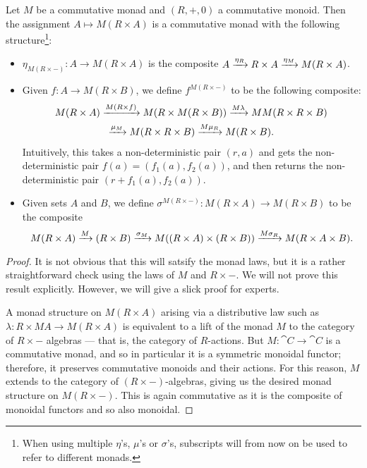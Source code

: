 \documentclass[DynamicalBook]{subfiles}
\begin{document}
\begin{proposition}
Let $M$ be a commutative monad and $(R, +, 0)$ a commutative monoid. Then the
assignment $A \mapsto M(R \times A)$ is a commutative monad with the following
structure\footnote{When using multiple $\eta$'s, $\mu$'s or $\sigma$'s, subscripts will from now on be used to refer to different monads.}:
\begin{itemize}
  \item $\eta_{M(R\times -)} : A \to M(R \times A)$ is the composite $A
    \xrightarrow{\eta_R} R \times A \xrightarrow{\eta_M} M(R \times A)$.
  \item Given $f : A \to M(R \times B)$, we define $f^{M(R \times -)}$ to be the
    following composite:
    \begin{multline*}
M(R \times A) \xrightarrow{M(R \times f)} M(R \times M(R \times B)) \xrightarrow{M\lambda} MM(R \times R \times B)\\\xrightarrow{\mu_{M}} M(R \times R \times B) \xrightarrow{M\mu_R} M(R \times B).
      \end{multline*}
 Intuitively, this takes a non-deterministic pair $(r, a)$ and gets the
 non-deterministic pair $f(a) = (f_1(a), f_2(a))$, and then returns the
 non-deterministic pair $(r + f_1(a), f_2(a))$.
  \item Given sets $A$ and $B$, we define $\sigma^{M(R \times -)} : M(R \times
    A) \to M(R \times B)$ to be the composite
    \[
M(R \times A) \xrightarrow{M}(R \times B) \xrightarrow{\sigma_M} M((R \times A) \times (R \times
B)) \xrightarrow{M\sigma_R} M(R \times A \times B).
    \]
\end{itemize}
\end{proposition}
\begin{proof}
It is not obvious that this will satsify the monad laws, but it is a rather
straightforward check using the laws of $M$ and $R \times -$. We will not prove
this result explicitly. However, we will give a slick proof for experts.

A monad structure on $M(R \times A)$ arising via a distributive law such as
$\lambda : R \times MA \to M(R \times A)$ is equivalent to a lift of the monad
$M$ to the category of $R \times -$ algebras --- that is, the category of
$R$-actions. But $M : \cat{C} \to \cat{C}$ is a commutative monad, and so in particular it is a
symmetric monoidal functor; therefore, it preserves commutative monoids and
their actions. For this reason, $M$ extends to the category of $(R \times -)$-algebras, giving
us the desired monad structure on $M(R \times -)$. This is again commutative as
it is the composite of monoidal functors and so also monoidal.
\end{proof}
\end{document}
